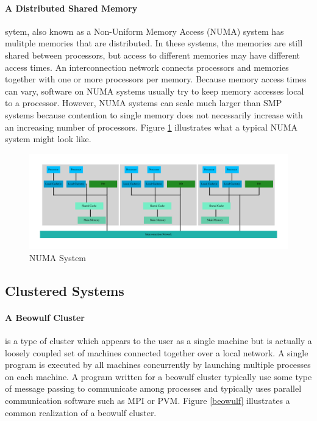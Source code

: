 \documentclass[11pt]{book}
\begin{document}
\paragraph{A Distributed Shared Memory} sytem, also known as a Non-Uniform Memory Access
(NUMA) system has mulitple memories that are distributed. In these systems, the memories are
still shared between processors, but access to different memories may have different access
times. An interconnection network connects processors and memories together with one or
more processors per memory. Because memory access times can vary, software on NUMA systems
usually try to keep memory accesses local to a processor. However, NUMA systems can scale
much larger than SMP systems because contention to single memory does not necessarily increase
with an increasing number of processors. Figure \ref{distributed} illustrates what a typical
NUMA system might look like.

\begin{figure}[H]
    \centering
    \includegraphics[width=\textwidth,quiet]{figs/graphviz/distributed.pdf}
    \caption{NUMA System}\label{distributed}
\end{figure}

\subsection{Clustered Systems}

\paragraph{A Beowulf Cluster} is a type of cluster which appears to the user as a single
machine but is actually a loosely coupled set of machines connected together over a local
network. A single program is executed by all machines concurrently by launching multiple
processes on each machine. A program written for a beowulf cluster typically use some type
of message passing to communicate among processes and typically uses parallel communication
software such as MPI or PVM. Figure \ref{beowulf} illustrates a common realization of a beowulf
cluster.
\end{document}
